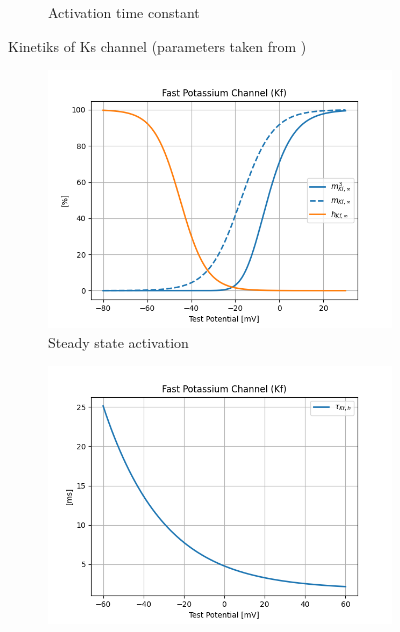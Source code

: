 \documentclass[11pt]{article}
\begin{document}
\begin{figure}[H]
\begin{subfigure}[t]{0.48\textwidth}
        \caption{Activation time constant}
        \label{fig_ks_time_constant}
    \end{subfigure}

    \caption{Kinetiks of Ks channel (parameters taken from \cite{gunayDistalSpikeInitiation2015})}
\end{figure}


\begin{figure}[H]
    \centering
    \begin{subfigure}[t]{0.48\textwidth}
        \centering
        \includegraphics[width=\textwidth]{./img/2025_01_23/Kf_steady_state_variables.png}
        \caption{Steady state activation}
        \label{fig_kf_steady_state_activation}
    \end{subfigure}
    \hfill
    \begin{subfigure}[t]{0.48\textwidth}
        \centering
        \includegraphics[width=\textwidth]{./img/2025_01_23/Kf_tau_h.png}

\end{subfigure}
\end{figure}
\end{document}
